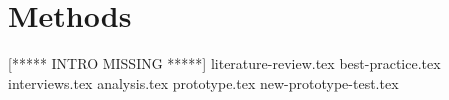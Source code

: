 
\chapter{Methods}
[***** INTRO MISSING *****]
{literature-review.tex}
{best-practice.tex}
{interviews.tex}
{analysis.tex}
{prototype.tex}
{new-prototype-test.tex}
